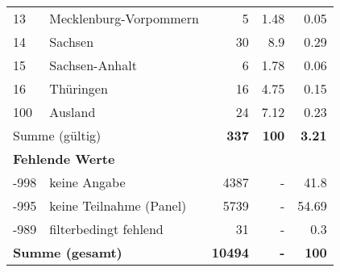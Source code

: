 \begin{longtable}{lXrrr}
     13 &
     \multicolumn{1}{X}{ Mecklenburg-Vorpommern   } &


       \num{5} &
       \num[round-mode=places,round-precision=2]{1.48} &
         \num[round-mode=places,round-precision=2]{0.05} \\

     14 &
     \multicolumn{1}{X}{ Sachsen   } &


       \num{30} &
       \num[round-mode=places,round-precision=2]{8.9} &
         \num[round-mode=places,round-precision=2]{0.29} \\

     15 &
     \multicolumn{1}{X}{ Sachsen-Anhalt   } &


       \num{6} &
       \num[round-mode=places,round-precision=2]{1.78} &
         \num[round-mode=places,round-precision=2]{0.06} \\

     16 &
     \multicolumn{1}{X}{ Thüringen   } &


       \num{16} &
       \num[round-mode=places,round-precision=2]{4.75} &
         \num[round-mode=places,round-precision=2]{0.15} \\

     100 &
     \multicolumn{1}{X}{ Ausland   } &


       \num{24} &
       \num[round-mode=places,round-precision=2]{7.12} &
         \num[round-mode=places,round-precision=2]{0.23} \\
     \midrule
     \multicolumn{2}{l}{Summe (gültig)} &
       \textbf{\num{337}} &
     \textbf{\num{100}} &
       \textbf{\num[round-mode=places,round-precision=2]{3.21}} \\
     \multicolumn{5}{l}{\textbf{Fehlende Werte}}\\
       -998 &
       keine Angabe &
         \num{4387} &
        - &
         \num[round-mode=places,round-precision=2]{41.8} \\
       -995 &
       keine Teilnahme (Panel) &
         \num{5739} &
        - &
         \num[round-mode=places,round-precision=2]{54.69} \\
       -989 &
       filterbedingt fehlend &
         \num{31} &
        - &
         \num[round-mode=places,round-precision=2]{0.3} \\
     \midrule
     \multicolumn{2}{l}{\textbf{Summe (gesamt)}} &
          \textbf{\num{10494}} &
        \textbf{-} &
        \textbf{\num{100}} \\
     \bottomrule
     \end{longtable}
     
